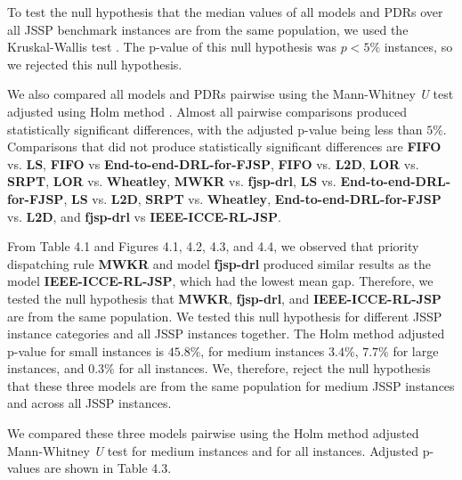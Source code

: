 To test the null hypothesis that the median values of all models and PDRs over all JSSP benchmark instances are from the same population, we used the Kruskal-Wallis test \cite{doi:10.1080/01621459.1952.10483441}. The p-value of this null hypothesis was $p < 5\%$ instances, so we rejected this null hypothesis.
\par
We also compared all models and PDRs pairwise using the Mann-Whitney \textit{U} test \cite{mannwhitneyutest} adjusted using Holm method \cite{holmmethod}. Almost all pairwise comparisons produced statistically significant differences, with the adjusted p-value being less than $5\%$. Comparisons that did not produce statistically significant differences are \textbf{FIFO} vs. \textbf{LS}, \textbf{FIFO} vs \textbf{End-to-end-DRL-for-FJSP}, \textbf{FIFO} vs. \textbf{L2D}, \textbf{LOR} vs. \textbf{SRPT}, \textbf{LOR} vs. \textbf{Wheatley}, \textbf{MWKR} vs. \textbf{fjsp-drl}, \textbf{LS} vs. \textbf{End-to-end-DRL-for-FJSP}, \textbf{LS} vs. \textbf{L2D}, \textbf{SRPT} vs. \textbf{Wheatley}, \textbf{End-to-end-DRL-for-FJSP} vs. \textbf{L2D}, and \textbf{fjsp-drl} vs \textbf{IEEE-ICCE-RL-JSP}.
\par
From Table 4.1 and Figures 4.1, 4.2, 4.3, and 4.4, we observed that priority dispatching rule \textbf{MWKR} and model \textbf{fjsp-drl} produced similar results as the model \textbf{IEEE-ICCE-RL-JSP}, which had the lowest mean gap. Therefore, we tested the null hypothesis that \textbf{MWKR}, \textbf{fjsp-drl}, and \textbf{IEEE-ICCE-RL-JSP} are from the same population. We tested this null hypothesis for different JSSP instance categories and all JSSP instances together. The Holm method adjusted p-value for small instances is $45.8\%$, for medium instances $3.4\%$, $7.7\%$ for large instances, and 0.3$\%$ for all instances. We, therefore, reject the null hypothesis that these three models are from the same population for medium JSSP instances and across all JSSP instances.
\par
We compared these three models pairwise using the Holm method adjusted Mann-Whitney \textit{U} test for medium instances and for all instances. Adjusted p-values are shown in Table 4.3.

